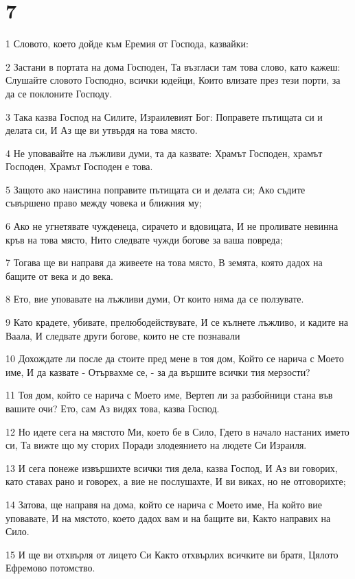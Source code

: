 \chapter{7}

\par 1 Словото, което дойде към Еремия от Господа, казвайки:
\par 2 Застани в портата на дома Господен, Та възгласи там това слово, като кажеш: Слушайте словото Господно, всички юдейци, Които влизате през тези порти, за да се поклоните Господу.
\par 3 Така казва Господ на Силите, Израилевият Бог: Поправете пътищата си и делата си, И Аз ще ви утвърдя на това място.
\par 4 Не уповавайте на лъжливи думи, та да казвате: Храмът Господен, храмът Господен, Храмът Господен е това.
\par 5 Защото ако наистина поправите пътищата си и делата си; Ако съдите съвършено право между човека и ближния му;
\par 6 Ако не угнетявате чужденеца, сирачето и вдовицата, И не проливате невинна кръв на това място, Нито следвате чужди богове за ваша повреда;
\par 7 Тогава ще ви направя да живеете на това място, В земята, която дадох на бащите от века и до века.
\par 8 Ето, вие уповавате на лъжливи думи, От които няма да се ползувате.
\par 9 Като крадете, убивате, прелюбодействувате, И се кълнете лъжливо, и кадите на Ваала, И следвате други богове, които не сте познавали
\par 10 Дохождате ли после да стоите пред мене в тоя дом, Който се нарича с Моето име, И да казвате - Отървахме се, - за да вършите всички тия мерзости?
\par 11 Тоя дом, който се нарича с Моето име, Вертеп ли за разбойници стана във вашите очи? Ето, сам Аз видях това, казва Господ.
\par 12 Но идете сега на мястото Ми, което бе в Сило, Гдето в начало настаних името си, Та вижте що му сторих Поради злодеянието на людете Си Израиля.
\par 13 И сега понеже извършихте всички тия дела, казва Господ, И Аз ви говорих, като ставах рано и говорех, а вие не послушахте, И ви виках, но не отговорихте;
\par 14 Затова, ще направя на дома, който се нарича с Моето име, На който вие уповавате, И на мястото, което дадох вам и на бащите ви, Както направих на Сило.
\par 15 И ще ви отхвърля от лицето Си Както отхвърлих всичките ви братя, Цялото Ефремово потомство.
